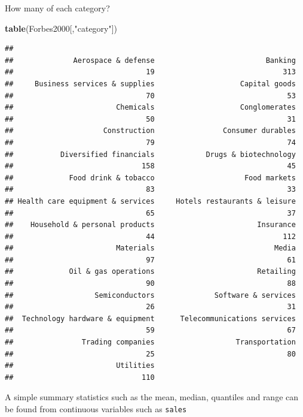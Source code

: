 \documentclass[]{book}
\newenvironment{Shaded}{\begin{snugshade}}{\end{snugshade}}
\newcommand{\KeywordTok}[1]{\textcolor[rgb]{0.13,0.29,0.53}{\textbf{#1}}}
\newcommand{\StringTok}[1]{\textcolor[rgb]{0.31,0.60,0.02}{#1}}
\newcommand{\NormalTok}[1]{#1}
\begin{document}
How many of each category?

\begin{Shaded}
\begin{Highlighting}[]
\KeywordTok{table}\NormalTok{(Forbes2000[,}\StringTok{"category"}\NormalTok{])}
\end{Highlighting}
\end{Shaded}

\begin{verbatim}
## 
##              Aerospace & defense                          Banking 
##                               19                              313 
##     Business services & supplies                    Capital goods 
##                               70                               53 
##                        Chemicals                    Conglomerates 
##                               50                               31 
##                     Construction                Consumer durables 
##                               79                               74 
##           Diversified financials            Drugs & biotechnology 
##                              158                               45 
##             Food drink & tobacco                     Food markets 
##                               83                               33 
## Health care equipment & services     Hotels restaurants & leisure 
##                               65                               37 
##    Household & personal products                        Insurance 
##                               44                              112 
##                        Materials                            Media 
##                               97                               61 
##             Oil & gas operations                        Retailing 
##                               90                               88 
##                   Semiconductors              Software & services 
##                               26                               31 
##  Technology hardware & equipment      Telecommunications services 
##                               59                               67 
##                Trading companies                   Transportation 
##                               25                               80 
##                        Utilities 
##                              110
\end{verbatim}

A simple summary statistics such as the mean, median, quantiles and
range can be found from continuous variables such as \texttt{sales}
\end{document}
